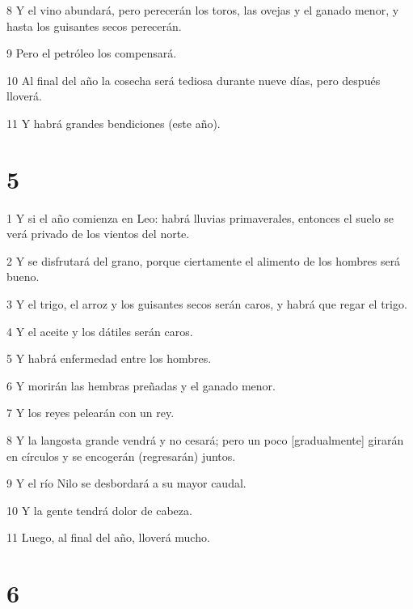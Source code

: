 \par 8 Y el vino abundará, pero perecerán los toros, las ovejas y el ganado menor, y hasta los guisantes secos perecerán.

\par 9 Pero el petróleo los compensará.

\par 10 Al final del año la cosecha será tediosa durante nueve días, pero después lloverá.

\par 11 Y habrá grandes bendiciones (este año).


\chapter{5}

\par 1 Y si el año comienza en Leo: habrá lluvias primaverales, entonces el suelo se verá privado de los vientos del norte.

\par 2 Y se disfrutará del grano, porque ciertamente el alimento de los hombres será bueno.

\par 3 Y el trigo, el arroz y los guisantes secos serán caros, y habrá que regar el trigo.

\par 4 Y el aceite y los dátiles serán caros.

\par 5 Y habrá enfermedad entre los hombres.

\par 6 Y morirán las hembras preñadas y el ganado menor.

\par 7 Y los reyes pelearán con un rey.

\par 8 Y la langosta grande vendrá y no cesará; pero un poco [gradualmente] girarán en círculos y se encogerán (regresarán) juntos.

\par 9 Y el río Nilo se desbordará a su mayor caudal.

\par 10 Y la gente tendrá dolor de cabeza.

\par 11 Luego, al final del año, lloverá mucho.


\chapter{6}


